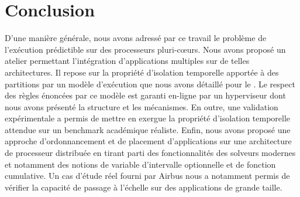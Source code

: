 \documentclass[main.tex]{subfiles}
\begin{document}
\section{Conclusion}
\label{sec_resumeFr_conclu}
D'une manière générale, nous avons adressé par ce travail le problème de l'exécution prédictible sur des processeurs pluri-c\oe{}urs. Nous avons proposé un atelier permettant l'intégration d'applications multiples sur de telles architectures. Il repose sur la propriété d'isolation temporelle apportée à des partitions par un modèle d'exécution que nous avons détaillé pour le \mppalong. Le respect des règles énoncées par ce modèle est garanti en-ligne par un hyperviseur dont nous avons présenté la structure et les mécanismes. En outre, une validation expérimentale a permis de mettre en exergue la propriété d'isolation temporelle attendue sur un benchmark académique réaliste. Enfin, nous avons proposé une approche d'ordonnancement et de placement d'applications sur une architecture de processeur distribuée en tirant parti des fonctionnalités des solveurs modernes et notamment des notions de variable d'intervalle optionnelle et de fonction cumulative. Un cas d'étude réel fourni par Airbus nous a notamment permis de vérifier la capacité de passage à l'échelle sur des applications de grande taille. 
\end{document}
